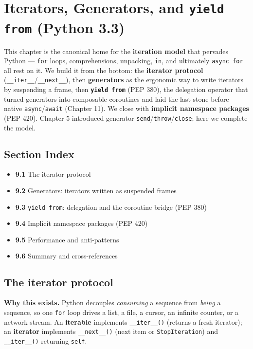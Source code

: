 \chapter{Iterators, Generators, and \texttt{yield from} (Python 3.3)}

This chapter is the canonical home for the \textbf{iteration model} that pervades Python ---
\texttt{for} loops, comprehensions, unpacking, \texttt{in}, and ultimately \texttt{async for} all
rest on it. We build it from the bottom: the \textbf{iterator protocol}
(\texttt{\_\_iter\_\_}/\texttt{\_\_next\_\_}), then \textbf{generators} as the ergonomic way to
write iterators by suspending a frame, then \textbf{\texttt{yield from}} (PEP 380), the delegation
operator that turned generators into composable coroutines and laid the last stone before native
\texttt{async}/\texttt{await} (Chapter 11). We close with \textbf{implicit namespace packages}
(PEP 420). Chapter 5 introduced generator \texttt{send}/\texttt{throw}/\texttt{close}; here we
complete the model.

\section*{Section Index}
\begin{itemize}
  \item \textbf{9.1} The iterator protocol
  \item \textbf{9.2} Generators: iterators written as suspended frames
  \item \textbf{9.3} \texttt{yield from}: delegation and the coroutine bridge (PEP 380)
  \item \textbf{9.4} Implicit namespace packages (PEP 420)
  \item \textbf{9.5} Performance and anti-patterns
  \item \textbf{9.6} Summary and cross-references
\end{itemize}

\section{The iterator protocol}

\textbf{Why this exists.} Python decouples \emph{consuming} a sequence from \emph{being} a
sequence, so one \texttt{for} loop drives a list, a file, a cursor, an infinite counter, or a
network stream. An \textbf{iterable} implements \texttt{\_\_iter\_\_()} (returns a fresh
iterator); an \textbf{iterator} implements \texttt{\_\_next\_\_()} (next item or
\texttt{StopIteration}) and \texttt{\_\_iter\_\_()} returning \texttt{self}.

